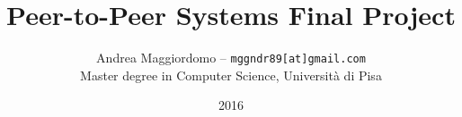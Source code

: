 \documentclass[a4paper, 11pt]{article}
\title{Peer-to-Peer Systems Final Project}
\author{Andrea Maggiordomo -- \texttt{mggndr89[at]gmail.com} \\[1mm] Master degree in Computer Science, Universit\`a di Pisa}
\date{2016}
\begin{document}


\maketitle









{}
\end{document}
